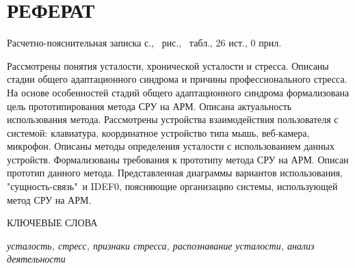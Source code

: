 \section*{РЕФЕРАТ}

Расчетно-пояснительная записка \pageref{LastPage} с., \totalfigures\ рис., \totaltables\ табл., 26 ист., 0 прил.

Рассмотрены понятия усталости, хронической усталости и стресса. Описаны стадии общего адаптационного синдрома и причины профессионального стресса. На основе особенностей стадий общего адаптационного синдрома формализована цель прототипирования метода СРУ на АРМ. Описана актуальность использования метода. Рассмотрены устройства взаимодействия пользователя с системой: клавиатура, координатное устройство типа мышь, веб-камера, микрофон. Описаны методы определения усталости с использованием данных устройств. Формализованы требования к прототипу метода СРУ на АРМ. Описан прототип данного метода. Представленная диаграммы вариантов использования, "сущность-связь"\ и IDEF0, поясняющие организацию системы, использующей метод СРУ на АРМ.

КЛЮЧЕВЫЕ СЛОВА

\textit{усталость, стресс, признаки стресса, распознавание усталости, анализ деятельности}

\pagebreak